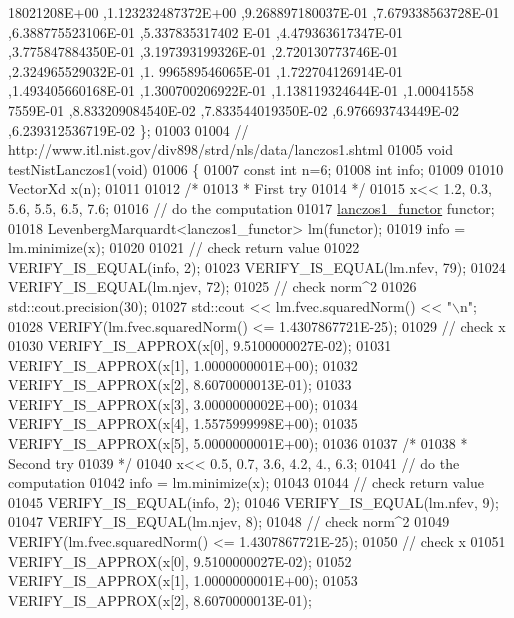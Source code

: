 \begin{DoxyCode}
      18021208E+00 ,1.123232487372E+00 ,9.268897180037E-01 ,7.679338563728E-01 ,6.388775523106E-01 ,5.337835317402
      E-01 ,4.479363617347E-01 ,3.775847884350E-01 ,3.197393199326E-01 ,2.720130773746E-01 ,2.324965529032E-01 ,1.
      996589546065E-01 ,1.722704126914E-01 ,1.493405660168E-01 ,1.300700206922E-01 ,1.138119324644E-01 ,1.00041558
      7559E-01 ,8.833209084540E-02 ,7.833544019350E-02 ,6.976693743449E-02 ,6.239312536719E-02 \};
01003 
01004 \textcolor{comment}{// http://www.itl.nist.gov/div898/strd/nls/data/lanczos1.shtml}
01005 \textcolor{keywordtype}{void} testNistLanczos1(\textcolor{keywordtype}{void})
01006 \{
01007   \textcolor{keyword}{const} \textcolor{keywordtype}{int} n=6;
01008   \textcolor{keywordtype}{int} info;
01009 
01010   VectorXd x(n);
01011 
01012   \textcolor{comment}{/*}
01013 \textcolor{comment}{   * First try}
01014 \textcolor{comment}{   */}
01015   x<< 1.2, 0.3, 5.6, 5.5, 6.5, 7.6;
01016   \textcolor{comment}{// do the computation}
01017   \hyperlink{structlanczos1__functor}{lanczos1\_functor} functor;
01018   LevenbergMarquardt<lanczos1\_functor> lm(functor);
01019   info = lm.minimize(x);
01020 
01021   \textcolor{comment}{// check return value}
01022   VERIFY\_IS\_EQUAL(info, 2);
01023   VERIFY\_IS\_EQUAL(lm.nfev, 79);
01024   VERIFY\_IS\_EQUAL(lm.njev, 72);
01025   \textcolor{comment}{// check norm^2}
01026   std::cout.precision(30);
01027   std::cout << lm.fvec.squaredNorm() << \textcolor{stringliteral}{"\(\backslash\)n"};
01028   VERIFY(lm.fvec.squaredNorm() <= 1.4307867721E-25);
01029   \textcolor{comment}{// check x}
01030   VERIFY\_IS\_APPROX(x[0], 9.5100000027E-02);
01031   VERIFY\_IS\_APPROX(x[1], 1.0000000001E+00);
01032   VERIFY\_IS\_APPROX(x[2], 8.6070000013E-01);
01033   VERIFY\_IS\_APPROX(x[3], 3.0000000002E+00);
01034   VERIFY\_IS\_APPROX(x[4], 1.5575999998E+00);
01035   VERIFY\_IS\_APPROX(x[5], 5.0000000001E+00);
01036 
01037   \textcolor{comment}{/*}
01038 \textcolor{comment}{   * Second try}
01039 \textcolor{comment}{   */}
01040   x<< 0.5, 0.7, 3.6, 4.2, 4., 6.3;
01041   \textcolor{comment}{// do the computation}
01042   info = lm.minimize(x);
01043 
01044   \textcolor{comment}{// check return value}
01045   VERIFY\_IS\_EQUAL(info, 2);
01046   VERIFY\_IS\_EQUAL(lm.nfev, 9);
01047   VERIFY\_IS\_EQUAL(lm.njev, 8);
01048   \textcolor{comment}{// check norm^2}
01049   VERIFY(lm.fvec.squaredNorm() <= 1.4307867721E-25);
01050   \textcolor{comment}{// check x}
01051   VERIFY\_IS\_APPROX(x[0], 9.5100000027E-02);
01052   VERIFY\_IS\_APPROX(x[1], 1.0000000001E+00);
01053   VERIFY\_IS\_APPROX(x[2], 8.6070000013E-01);

\end{DoxyCode}
